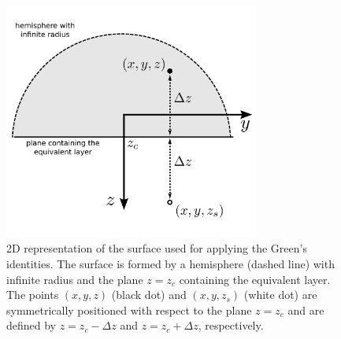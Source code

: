 
\begin{figure}
	\centering
	\includegraphics[width=0.75\textwidth]{Fig/Fig7.png}
	\caption{2D representation of the surface used for applying the Green's 
	identities. The surface is formed by a hemisphere (dashed line) with infinite
	radius and the plane $z = z_{c}$ containing the equivalent layer. 
	The points $(x, y, z)$ (black dot) and $(x, y, z_{s})$ (white dot) are 
	symmetrically positioned with respect to the plane $z = z_{c}$ and are
	defined by $z = z_{c} - \Delta z$ and $z = z_{c} + \Delta z$, respectively.}
	\label{fig:surface_Green}
\end{figure}